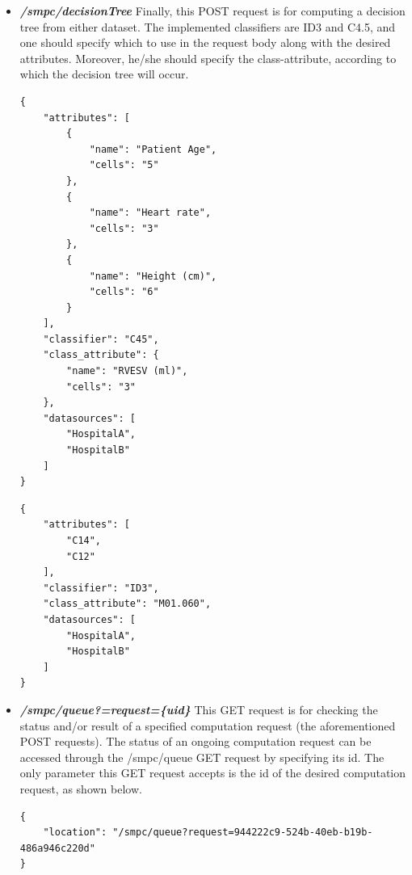 \begin{itemize}
\item \textbf{\textit{/smpc/decisionTree}}
Finally, this POST request is for computing a decision tree from either dataset.
The implemented classifiers are ID3 and C4.5, and one should specify which to use in the request body along with the desired attributes.
Moreover, he/she should specify the class-attribute, according to which the decision tree will occur.

{
\begin{verbatim}
{
    "attributes": [
        {
            "name": "Patient Age",
            "cells": "5"
        },
        {
            "name": "Heart rate",
            "cells": "3"
        },
        {
            "name": "Height (cm)",
            "cells": "6"
        }
    ],
    "classifier": "C45",
    "class_attribute": {
        "name": "RVESV (ml)",
        "cells": "3"
    },
    "datasources": [
        "HospitalA",
        "HospitalB"
    ]
}
\end{verbatim}
\label{sc:decisionTree-post-numerical}
}

{
\begin{verbatim}
{
    "attributes": [
        "C14",
        "C12"
    ],
    "classifier": "ID3",
    "class_attribute": "M01.060",
    "datasources": [
        "HospitalA",
        "HospitalB"
    ]
}
\end{verbatim}
\label{sc:decisionTree-post-categorical}
}




\item \textbf{\textit{/smpc/queue?=request=\{uid\}}}
This GET request is for checking the status and/or result of a specified computation request (the aforementioned POST requests).
The status of an ongoing computation request can be accessed through the /smpc/queue GET request by specifying its id.
The only parameter this GET request accepts is the id of the desired computation request, as shown below.

{
\begin{verbatim}
{
    "location": "/smpc/queue?request=944222c9-524b-40eb-b19b-486a946c220d"
}
\end{verbatim}
\label{sc:get}
}


\end{itemize}
